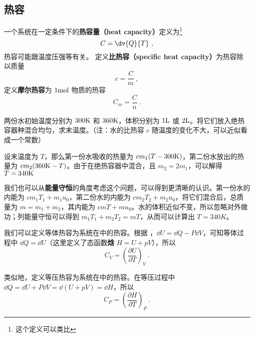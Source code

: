 
\begin{issues}
\issueTODO
\end{issues}
\subsection{热容}
一个系统在一定条件下的\textbf{热容量（heat capacity）}定义为\footnote{这个定义可以类比}
\begin{equation}
C = \dv{Q}{T}~,
\end{equation}
热容可能跟温度压强等有关。 定义\textbf{比热容（specific heat capacity）}为热容除以质量
\begin{equation}
c = \frac{C}{m}~,
\end{equation}
定义\textbf{摩尔热容}为 $1 \rm{mol}$ 物质的热容
\begin{equation}
C_m=\frac{C}{n}~.
\end{equation}

\begin{example}{}
两份水初始温度分别为 $300\rm{K}$ 和 $360\rm{K}$，体积分别为 $1\rm{L}$ 或 $2 \rm{L}$。将它们放入绝热容器种混合均匀，求末温度。（注：水的比热容 $c$ 随温度的变化不大，可以近似看成一个常数）

设末温度为 $T$，那么第一份水吸收的热量为 $c m_1(T-300\rm{K})$，第二份水放出的热量为 $cm_2(360{\rm{K}}-T)$。由于在绝热容器中混合，且 $m_2=2m_1$，可以解得 $T=340\rm{K}$

我们也可以从\textbf{能量守恒}的角度考虑这个问题，可以得到更清晰的认识。第一份水的内能为 $cm_1T_1+m_1u_0$，第二份水的内能为 $cm_2T_2+m_2u_0$，将它们混合后，总质量为 $m=m_1+m_2$，其内能为 $cmT+mu_0$。水的体积近似不变，所以忽略对外做功；列能量守恒可以得到 $m_1T_1+m_2T_2=mT$，从而可以计算出 $T=340K$。
\end{example}

我们可以定义等体热容为系统在中的热容。根据 ，$\dd U=\dd Q-P\dd V$，可知等体过程中 $\dd Q=\dd U$（这里定义了态函数\textbf{焓} $H=U+pV$），所以
\begin{equation}\label{eq_ThCapa_1}
C_V=\left(\frac{\partial U}{\partial T}\right)_V~.
\end{equation}

类似地，定义等压热容为系统在中的热容。在等压过程中 $\dd Q=\dd U+P\dd V=\dd (U+pV)=\dd H$，所以
\begin{equation}\label{eq_ThCapa_2}
C_P=\left(\frac{\partial H}{\partial T}\right)_P~.
\end{equation}

